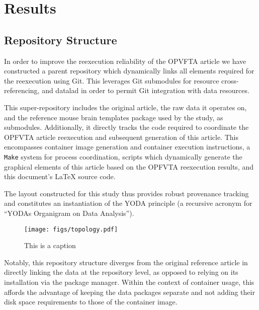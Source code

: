 \section{Results}

\subsection{Repository Structure}
In order to improve the reexecution reliability of the OPVFTA article we have constructed a parent repository which dynamically links all elements required for the reexecution using Git.
This leverages Git submodules for resource cross-referencing, and datalad \supercite{datalad} in order to permit Git integration with data resources.

This super-repository includes the original article, the raw data it operates on, and the reference mouse brain templates package used by the study, as submodules.
Additionally, it directly tracks the code required to coordinate the OPFVTA article reexecution and subsequent generation of this article.
This encompasses container image generation and container execution instructions, a \texttt{Make} system for process coordination, scripts which dynamically generate the graphical elements of this article based on the OPFVTA reexecution results, and this document's LaTeX source code.

The layout constructed for this study thus provides robust provenance tracking and constitutes an instantiation of the YODA principle (a recursive acronym for “YODAs Organigram on Data Analysis”).

\begin{figure}
	\centering
	\texttt{[image: figs/topology.pdf]}
	\caption{
		This is a caption
	}
	\label{fig:topology}
\end{figure}

Notably, this repository structure diverges from the original reference article in directly linking the data at the repository level, as opposed to relying on its installation via the package manager.
Within the context of container usage, this affords the advantage of keeping the data packages separate and not adding their disk space requirements to those of the container image.


